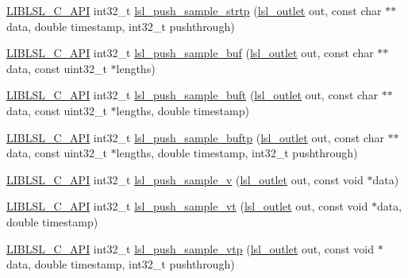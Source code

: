 \begin{DoxyCompactItemize}
\item 
\hyperlink{lsl__cpp_8h_aafd0ef1813e8be84a1420c4f1df64615}{L\+I\+B\+L\+S\+L\+\_\+\+C\+\_\+\+A\+PI} int32\+\_\+t \hyperlink{namespacelsl_aeb9537e1d060020c99c47371b07bcb24}{lsl\+\_\+push\+\_\+sample\+\_\+strtp} (\hyperlink{namespacelsl_abcf512b0f66dacf86c10b165995fd50b}{lsl\+\_\+outlet} out, const char $\ast$$\ast$data, double timestamp, int32\+\_\+t pushthrough)
\item 
\hyperlink{lsl__cpp_8h_aafd0ef1813e8be84a1420c4f1df64615}{L\+I\+B\+L\+S\+L\+\_\+\+C\+\_\+\+A\+PI} int32\+\_\+t \hyperlink{namespacelsl_a77dbefbfa9fc565f9ead1db3574ef001}{lsl\+\_\+push\+\_\+sample\+\_\+buf} (\hyperlink{namespacelsl_abcf512b0f66dacf86c10b165995fd50b}{lsl\+\_\+outlet} out, const char $\ast$$\ast$data, const uint32\+\_\+t $\ast$lengths)
\item 
\hyperlink{lsl__cpp_8h_aafd0ef1813e8be84a1420c4f1df64615}{L\+I\+B\+L\+S\+L\+\_\+\+C\+\_\+\+A\+PI} int32\+\_\+t \hyperlink{namespacelsl_ace903fc8ac868a1afedf98090f5c5b4c}{lsl\+\_\+push\+\_\+sample\+\_\+buft} (\hyperlink{namespacelsl_abcf512b0f66dacf86c10b165995fd50b}{lsl\+\_\+outlet} out, const char $\ast$$\ast$data, const uint32\+\_\+t $\ast$lengths, double timestamp)
\item 
\hyperlink{lsl__cpp_8h_aafd0ef1813e8be84a1420c4f1df64615}{L\+I\+B\+L\+S\+L\+\_\+\+C\+\_\+\+A\+PI} int32\+\_\+t \hyperlink{namespacelsl_a62d7f7be3db90336d61e89633c4b1a5e}{lsl\+\_\+push\+\_\+sample\+\_\+buftp} (\hyperlink{namespacelsl_abcf512b0f66dacf86c10b165995fd50b}{lsl\+\_\+outlet} out, const char $\ast$$\ast$data, const uint32\+\_\+t $\ast$lengths, double timestamp, int32\+\_\+t pushthrough)
\item 
\hyperlink{lsl__cpp_8h_aafd0ef1813e8be84a1420c4f1df64615}{L\+I\+B\+L\+S\+L\+\_\+\+C\+\_\+\+A\+PI} int32\+\_\+t \hyperlink{namespacelsl_a25ee57785d5ab7143605ee9f59c1a0cf}{lsl\+\_\+push\+\_\+sample\+\_\+v} (\hyperlink{namespacelsl_abcf512b0f66dacf86c10b165995fd50b}{lsl\+\_\+outlet} out, const void $\ast$data)
\item 
\hyperlink{lsl__cpp_8h_aafd0ef1813e8be84a1420c4f1df64615}{L\+I\+B\+L\+S\+L\+\_\+\+C\+\_\+\+A\+PI} int32\+\_\+t \hyperlink{namespacelsl_a8032f4283b186f0f8b8e657f6642e062}{lsl\+\_\+push\+\_\+sample\+\_\+vt} (\hyperlink{namespacelsl_abcf512b0f66dacf86c10b165995fd50b}{lsl\+\_\+outlet} out, const void $\ast$data, double timestamp)
\item 
\hyperlink{lsl__cpp_8h_aafd0ef1813e8be84a1420c4f1df64615}{L\+I\+B\+L\+S\+L\+\_\+\+C\+\_\+\+A\+PI} int32\+\_\+t \hyperlink{namespacelsl_a750c5759d30e4e0a47223c7048bfa4ca}{lsl\+\_\+push\+\_\+sample\+\_\+vtp} (\hyperlink{namespacelsl_abcf512b0f66dacf86c10b165995fd50b}{lsl\+\_\+outlet} out, const void $\ast$data, double timestamp, int32\+\_\+t pushthrough)

\end{DoxyCompactItemize}
